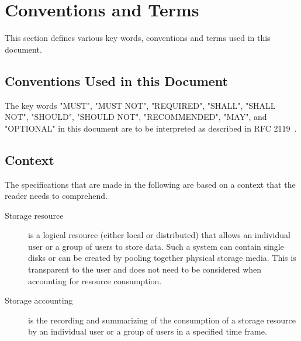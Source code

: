 \section{Conventions and Terms}

This section defines various key words, conventions and terms used in this document.

\subsection{Conventions Used in this Document}
The key words "MUST", "MUST NOT", "REQUIRED", "SHALL", "SHALL NOT", 
"SHOULD", "SHOULD NOT", "RECOMMENDED",  "MAY", and 
"OPTIONAL" in this document are to be interpreted as described in
RFC 2119~\cite{rfc2119}.


\subsection{Context}

The specifications that are made in the following are based on a context that
the reader needs to comprehend.

\begin{description}

\item[Storage resource] is a logical resource (either local or distributed)
that allows an individual user or a group of users to store data. Such a system
can contain single disks or can be created by pooling together physical storage
media. This is transparent to the user and does not need to be considered when
accounting for resource consumption.

\item[Storage accounting] is the recording and summarizing of the consumption
of a storage resource by an individual user or a group of users in a specified
time frame.

\end{description}

